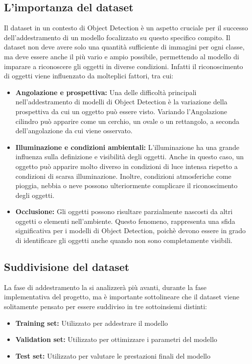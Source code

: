 \subsection{L'importanza del dataset}
Il dataset in un contesto di Object Detection è un aspetto cruciale per il successo
dell'addestramento di un modello focalizzato su questo specifico compito.
Il dataset non deve avere solo una quantità sufficiente di immagini per ogni classe,
ma deve essere anche il più vario e ampio possibile, permettendo al modello di
imparare a riconoscere gli oggetti in diverse condizioni.
Infatti il riconoscimento di oggetti viene influenzato da molteplici fattori, tra cui:


\begin{itemize}
   \item \textbf{Angolazione e prospettiva:} Una delle difficoltà
   principali nell'addestramento di modelli di Object Detection è la variazione
   della prospettiva da cui un oggetto può essere visto. Variando l'Angolazione
   cilindro può apparire come un cerchio, un ovale o un rettangolo, a seconda
   dell'angolazione da cui viene osservato.


   \item \textbf{Illuminazione e condizioni ambientali:} L'illuminazione ha una grande
   influenza sulla definizione e visibilità degli oggetti. Anche in questo caso,
   un oggetto può apparire molto diverso in condizioni di luce intensa rispetto
   a condizioni di scarsa illuminazione. Inoltre, condizioni atmosferiche come
   pioggia, nebbia o neve possono ulteriormente complicare il riconoscimento
   degli oggetti.


   \item \textbf{Occlusione:} Gli oggetti possono risultare parzialmente nascosti da altri oggetti
   o elementi nell'ambiente. Questo fenomeno,  rappresenta una  sfida significativa
   per i modelli di Object Detection, poichè devono essere in grado di identificare
   gli oggetti anche quando non sono completamente visibili.


\end{itemize}


\subsection{Suddivisione del dataset}


La fase di addestramento la si analizzerà più avanti, durante la fase implementativa del progetto,
ma è importante sottolineare che il dataset viene solitamente pensato per essere suddiviso in tre sottoinsiemi distinti:
\begin{itemize}
   \item \textbf{Training set:} Utilizzato per addestrare il modello
   \item   \textbf{Validation set:} Utilizzato per ottimizzare i parametri del modello
   \item \textbf{Test set:} Utilizzato per valutare le prestazioni finali del modello
\end{itemize}


